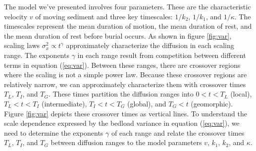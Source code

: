 \documentclass[]{agujournal2018}
\begin{document}
The model we've presented involves four parameters. These are the characteristic velocity $v$ of moving sediment and three key timescales: $1/k_2$, $1/k_1$, and $1/\kappa$.
The timescales represent the mean duration of motion, the mean duration of rest, and the mean duration of rest before burial occurs.
As shown in figure \ref{fig:var}, scaling laws $\sigma_x^2 \propto t^\gamma$ approximately characterize the diffusion in each scaling range.
The exponents $\gamma$ in each range result from competition between different terms in equation (\ref{eq:var}).
Between these ranges, there are crossover regions where the scaling is not a simple power law.
Because these crossover regions are relatively narrow, we can approximately characterize them with crossover times $T_L$, $T_I$, and $T_G$.
These times partition the diffusion ranges into $0< t < T_L$ (local), $T_L < t < T_I$ (intermediate), $T_I < t < T_G$ (global), and $T_G < t$ (geomorphic). 
Figure \ref{fig:var} depicts these crossover times as vertical lines.
To understand the scale dependence expressed by the bedload variance in equation (\ref{eq:var}), we need to determine the exponents $\gamma$ of each range and relate the crossover times $T_L$, $T_I$, and $T_G$ between diffusion ranges to the model parameters $v$, $k_1$, $k_2$, and $\kappa$.
\end{document}

